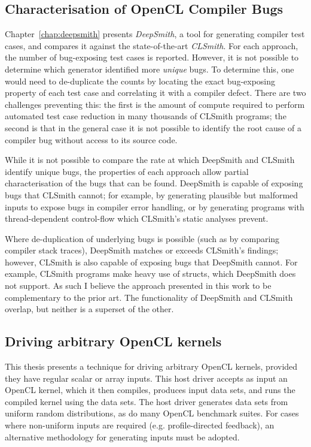 \subsection{Characterisation of OpenCL Compiler Bugs}

Chapter~\ref{chap:deepsmith} presents \emph{DeepSmith}, a tool for generating compiler test cases, and compares it against the state-of-the-art \emph{CLSmith}. For each approach, the number of bug-exposing test cases is reported. However, it is not possible to determine which generator identified more \emph{unique} bugs. To determine this, one would need to de-duplicate the counts by locating the exact bug-exposing property of each test case and correlating it with a compiler defect. There are two challenges preventing this: the first is the amount of compute required to perform automated test case reduction in many thousands of CLSmith programs; the second is that in the general case it is not possible to identify the root cause of a compiler bug without access to its source code.

While it is not possible to compare the rate at which DeepSmith and CLSmith identify unique bugs, the properties of each approach allow partial characterisation of the bugs that can be found. DeepSmith is capable of exposing bugs that CLSmith cannot; for example, by generating plausible but malformed inputs to expose bugs in compiler error handling, or by generating programs with thread-dependent control-flow which CLSmith's static analyses prevent.

Where de-duplication of underlying bugs is possible (such as by comparing compiler stack traces), DeepSmith matches or exceeds CLSmith's findings; however, CLSmith is also capable of exposing bugs that DeepSmith cannot. For example, CLSmith programs make heavy use of structs, which DeepSmith does not support. As such I believe the approach presented in this work to be complementary to the prior art. The functionality of DeepSmith and CLSmith overlap, but neither is a superset of the other.


\subsection{Driving arbitrary OpenCL kernels}

This thesis presents a technique for driving arbitrary OpenCL kernels, provided they have regular scalar or array inputs. This host driver accepts as input an OpenCL kernel, which it then compiles, produces input data sets, and runs the compiled kernel using the data sets. The host driver generates data sets from uniform random distributions, as do many OpenCL benchmark suites. For cases where non-uniform inputs are required (e.g. profile-directed feedback), an alternative methodology for generating inputs must be adopted.


